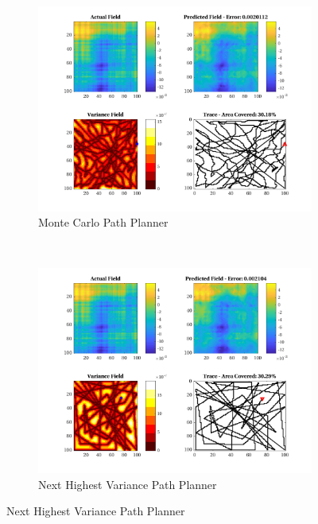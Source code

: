 \begin{figure}[htb!]
    \centering
    \begin{subfigure}[t]{0.5\textwidth}
        \centering
        \includegraphics[width=\linewidth]{figures/hbresults/mc_30p_100x100_sf_100_seed_3.png}
        \captionsetup{skip=0.10\baselineskip,size=footnotesize}
        \caption{Monte Carlo Path Planner}
    \end{subfigure}%
    ~ 
    \begin{subfigure}[t]{0.5\textwidth}
        \centering
        \includegraphics[width=\linewidth]{figures/hbresults/nhv_30p_100x100_sf_100_seed_3.png}
        \captionsetup{skip=0.10\baselineskip,size=footnotesize}
        \caption{Next Highest Variance Path Planner}

\end{subfigure}
\end{figure}
